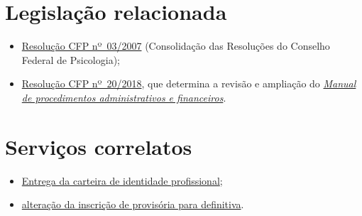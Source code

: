 \section{Legislação relacionada}

\begin{itemize}
	\item
	\href{https://atosoficiais.com.br/cfp/resolucao-administrativa-financeira-n-3-2007-institui-a-consolidacao-das-resolucoes-do-conselho-federal-de-psicologia?origin=instituicao&q=resolu\%C3\%A7\%C3\%A3o\%203/2007}{Resolução
		CFP nº~03/2007} (Consolidação das Resoluções do Conselho Federal de
	Psicologia);
	\item
	\href{https://transparencia.cfp.org.br/wp-content/uploads/sites/7/2020/05/Manual-de-Procedimentos-Administrativos-e-Financeiro-CFP-RES-20.2018.pdf}{\href{https://atosoficiais.com.br/cfp/resolucao-administrativa-financeira-n-20-2018-altera-o-manual-de-procedimentos-administrativo-e-financeiro-do-sistema-conselhos-de-psicologia-anexo-da-resolucao-cfp-n-202018-a-resolucao-cfp-n-03-2007-a-resolucao-cfp-n-16-2019-e-da-outras-providencias}{Resolução
			CFP nº~20/2018}}, que determina a revisão e ampliação do
	\href{https://transparencia.cfp.org.br/wp-content/uploads/sites/7/2020/05/Manual-de-Procedimentos-Administrativos-e-Financeiro-CFP-RES-20.2018.pdf}{\emph{Manual
			de procedimentos administrativos e financeiros}}.
\end{itemize}

\section{Serviços correlatos}

\begin{itemize}
	\item
	\hyperref[chap:pf-cip]{Entrega da carteira de identidade profissional};
	\item
	\hyperref[chap:pf-inscricao_definitiva]{alteração da inscrição de provisória para definitiva}.
\end{itemize}

\sumario